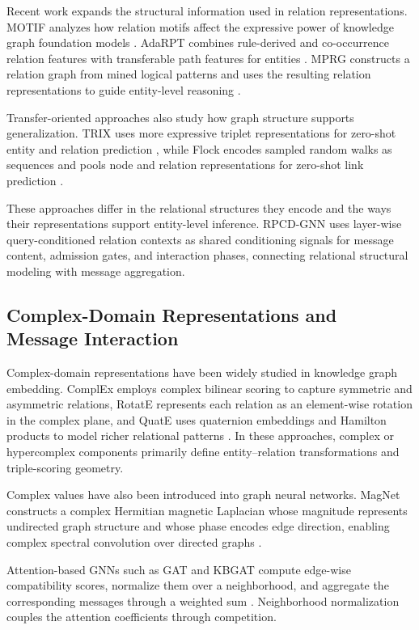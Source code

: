 \documentclass[a4paper,fleqn]{cas-dc}
\begin{document}
Recent work expands the structural information used in relation representations. MOTIF analyzes how relation motifs affect the expressive power of knowledge graph foundation models \citep{MOTIF2025}. AdaRPT combines rule-derived and co-occurrence relation features with transferable path features for entities \citep{AdaRPT2025}. MPRG constructs a relation graph from mined logical patterns and uses the resulting relation representations to guide entity-level reasoning \citep{MPRG2026}.

Transfer-oriented approaches also study how graph structure supports generalization. TRIX uses more expressive triplet representations for zero-shot entity and relation prediction \citep{TRIX2025}, while Flock encodes sampled random walks as sequences and pools node and relation representations for zero-shot link prediction \citep{Flock2026}.

These approaches differ in the relational structures they encode and the ways their representations support entity-level inference. RPCD-GNN uses layer-wise query-conditioned relation contexts as shared conditioning signals for message content, admission gates, and interaction phases, connecting relational structural modeling with message aggregation.

\subsection{Complex-Domain Representations and Message Interaction}\label{subsec:complex-message-interaction}

Complex-domain representations have been widely studied in knowledge graph embedding. ComplEx employs complex bilinear scoring to capture symmetric and asymmetric relations, RotatE represents each relation as an element-wise rotation in the complex plane, and QuatE uses quaternion embeddings and Hamilton products to model richer relational patterns \citep{Trouillon2016ComplEx,Sun2019RotatE,Zhang2019QuatE}. In these approaches, complex or hypercomplex components primarily define entity--relation transformations and triple-scoring geometry.

Complex values have also been introduced into graph neural networks. MagNet constructs a complex Hermitian magnetic Laplacian whose magnitude represents undirected graph structure and whose phase encodes edge direction, enabling complex spectral convolution over directed graphs \citep{Zhang2021MagNet}.

Attention-based GNNs such as GAT and KBGAT compute edge-wise compatibility scores, normalize them over a neighborhood, and aggregate the corresponding messages through a weighted sum \citep{Velickovic2018GAT,Nathani2019KBGAT}. Neighborhood normalization couples the attention coefficients through competition.
\end{document}
